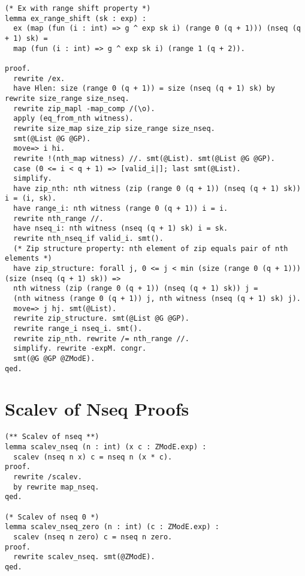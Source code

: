 \begin{lstlisting}[style=easycrypt, caption=Proof of Ex Range Shift Property, breaklines=true, breakatwhitespace=true, frame=single, keepspaces=true]
(* Ex with range shift property *)
lemma ex_range_shift (sk : exp) :
  ex (map (fun (i : int) => g ^ exp sk i) (range 0 (q + 1))) (nseq (q + 1) sk) =
  map (fun (i : int) => g ^ exp sk i) (range 1 (q + 2)).
    
proof.
  rewrite /ex.
  have Hlen: size (range 0 (q + 1)) = size (nseq (q + 1) sk) by rewrite size_range size_nseq.
  rewrite zip_mapl -map_comp /(\o). 
  apply (eq_from_nth witness). 
  rewrite size_map size_zip size_range size_nseq.
  smt(@List @G @GP).
  move=> i hi.
  rewrite !(nth_map witness) //. smt(@List). smt(@List @G @GP).
  case (0 <= i < q + 1) => [valid_i|]; last smt(@List).
  simplify.
  have zip_nth: nth witness (zip (range 0 (q + 1)) (nseq (q + 1) sk)) i = (i, sk).
  have range_i: nth witness (range 0 (q + 1)) i = i.
  rewrite nth_range //.
  have nseq_i: nth witness (nseq (q + 1) sk) i = sk.
  rewrite nth_nseq_if valid_i. smt().
  (* Zip structure property: nth element of zip equals pair of nth elements *)
  have zip_structure: forall j, 0 <= j < min (size (range 0 (q + 1))) (size (nseq (q + 1) sk)) =>
  nth witness (zip (range 0 (q + 1)) (nseq (q + 1) sk)) j = 
  (nth witness (range 0 (q + 1)) j, nth witness (nseq (q + 1) sk) j).
  move=> j hj. smt(@List).
  rewrite zip_structure. smt(@List @G @GP).
  rewrite range_i nseq_i. smt().
  rewrite zip_nth. rewrite /= nth_range //. 
  simplify. rewrite -expM. congr.
  smt(@G @GP @ZModE).
qed.
\end{lstlisting}

\section{Scalev of Nseq Proofs}
\label{sec:scalev-nseq-proofs}

\begin{lstlisting}[style=easycrypt, caption=Proof of Scalev of Nseq, breaklines=true, breakatwhitespace=true, frame=single, keepspaces=true]
(** Scalev of nseq **)
lemma scalev_nseq (n : int) (x c : ZModE.exp) :
  scalev (nseq n x) c = nseq n (x * c).
proof.
  rewrite /scalev.
  by rewrite map_nseq.
qed.

(* Scalev of nseq 0 *)
lemma scalev_nseq_zero (n : int) (c : ZModE.exp) :
  scalev (nseq n zero) c = nseq n zero.
proof.
  rewrite scalev_nseq. smt(@ZModE).
qed.
\end{lstlisting}

